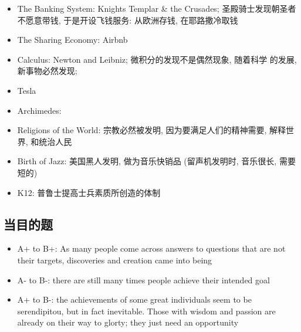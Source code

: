 \documentclass{article}
\begin{document}
\begin{itemize}
\begin{itemize}
          \item The Banking System: Knights Templar \& the Crusades;
          圣殿骑士发现朝圣者不愿意带钱, 于是开设飞钱服务: 从欧洲存钱, 在耶路撒冷取钱
          \item The Sharing Economy: Airbnb
          \item Calculus: Newton and Leibniz; 微积分的发现不是偶然现象, 随着科学
          的发展, 新事物必然发现;
          \item Tesla
          \item Archimedes:
          \item Religions of the World: 宗教必然被发明, 因为要满足人们的精神需要,
          解释世界, 和统治人民
          \item Birth of Jazz: 美国黑人发明, 做为音乐快销品 (留声机发明时, 音乐很长,
          需要短的)
          \item K12: 普鲁士提高士兵素质所创造的体制
        \end{itemize}
      \end{itemize}

    \subsection{当目的题}

      \begin{itemize}
        \item A+ to B+: As many people come across answers to questions that
        are not their targets, discoveries and creation came into being
        \item A- to B-: there are still many times people achieve their
        intended goal
        \item A+ to B-: the achievements of some great individuals seem to be
        serendipitou, but in fact inevitable. Those with wisdom and passion
        are already on their way to glorty; they just need an opportunity
      \end{itemize}
\end{document}

